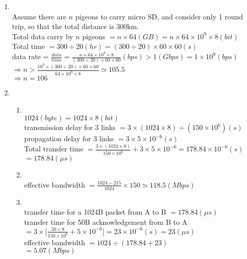 \documentclass[10pt, a4paper]{article}
\begin{document}
\begin{enumerate}
\item\mbox{}\\
    Assume there are $n$ pigeons to carry micro SD, and consider only 1 round trip, so that the total distance is 300km.\\
    Total data carry by $n$ pigeons $= n \times 64 (GB) = n \times 64 \times 10^9 \times 8 (bit)$\\
    Total time $= 300 \div 20 (hr) = (300 \div 20) \times 60 \times 60 (s)$\\
    data rate = $\frac{data}{time} = \frac{n \times 64 \times 10^9 \times 8}{(300 \div 20) \times 60 \times 60} (bps) > 1 (Gbps) = 1 \times 10^9 (bps)$\\
    $\Rightarrow n > \frac{10^9 \times (300 \div 20) \times 60 \times 60}{64 \times 10^9 \times 8} \simeq 105.5$\\
    $\Rightarrow n = 106$
\item
    \begin{enumerate}
    \item\mbox{}\\
        $1024 (byte) = 1024 \times 8 (bit)$\\
        transmission delay for 3 links $= 3 \times (1024 \times 8) \div (150 \times 10^6) (s)$\\
        propagation delay for 3 links $= 3 \times 5 \times 10^{-6} (s)$\\
        Total transfer time $= \frac{3 \times (1024 \times 8)}{150 \times 10^6} + 3 \times 5 \times 10^{-6} = 178.84 \times 10^{-6} (s)$\\
        $= 178.84 (\mu s)$
    \item\mbox{}\\
        effective bandwidth $= \frac{1024 - 215}{1024} \times 150 \simeq 118.5 (Mbps)$
    \item\mbox{}\\
        transfer time for a 1024B packet from A to B $= 178.84 (\mu s)$\\
        transfer time for 50B acknowledgement from B to A\\
        $= 3 \times \lbrack\frac{50 \times 8}{150 \times 10^6} + 5 \times 10^{-6}\rbrack = 23 \times 10^{-6} (s) = 23 (\mu s)$\\
        effective bandwidth $= 1024 \div (178.84 + 23)$\\
        $= 5.07 (Mbps)$
    \end{enumerate}


\end{enumerate}
\end{document}
